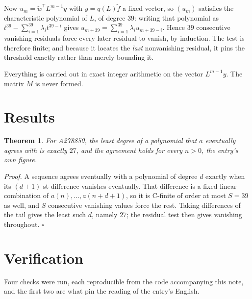 \documentclass[11pt]{article}
\newtheorem{theorem}{Theorem}
\theoremstyle{definition}
\begin{document}
Now $u_m = \tilde w^{\mathsf T} L^{m-1} y$ with $y = q(L)\tilde f$ a fixed vector, so $(u_m)$ satisfies the characteristic polynomial of $L$, of degree $39$: writing that polynomial as $t^{39} - \sum_{i=1}^{39} \lambda_i t^{39-i}$ gives $u_{m+39} = \sum_{i=1}^{39} \lambda_i u_{m+39-i}$. Hence $39$ consecutive vanishing residuals force every later residual to vanish, by induction. The test is therefore finite; and because it locates the {\itshape last} nonvanishing residual, it pins the threshold exactly rather than merely bounding it.

Everything is carried out in exact integer arithmetic on the vector $L^{m-1}y$. The matrix $M$ is never formed.

\section{Results}

\begin{theorem} For A278850, the least degree of a polynomial that $a$ eventually agrees with is exactly $27$, and the agreement holds for every $n > 0$, the entry's own figure.\end{theorem}

{\itshape Proof.} A sequence agrees eventually with a polynomial of degree $d$ exactly when its $(d+1)$-st difference vanishes eventually. That difference is a fixed linear combination of $a(n),\dots,a(n+d+1)$, so it is C-finite of order at most $S = 39$ as well, and $S$ consecutive vanishing values force the rest. Taking differences of the tail gives the least such $d$, namely $27$; the residual test then gives vanishing throughout. $\square$

\section{Verification}

Four checks were run, each reproducible from the code accompanying this note, and the first two are what pin the reading of the entry's English.
\end{document}
